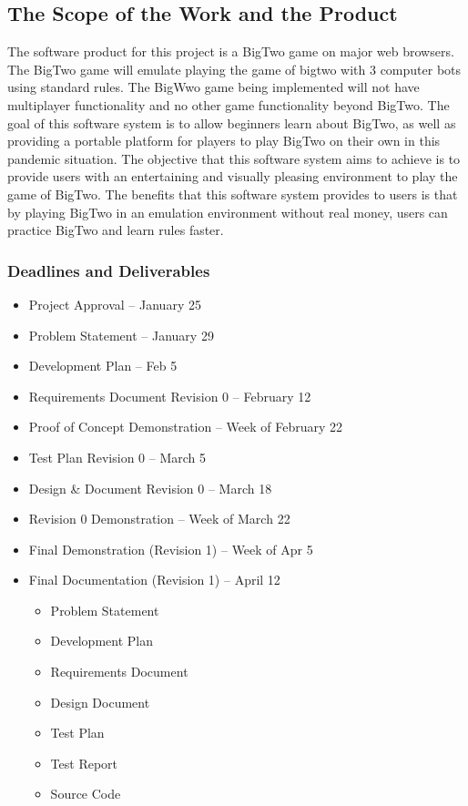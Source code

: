 \documentclass[12pt, titlepage]{article}
\begin{document}
\subsection{The Scope of the Work and the Product}
The software product for this project is a BigTwo game on major web browsers. The BigTwo game will emulate playing the game of bigtwo with 3 computer bots using standard rules. The BigWwo game being implemented will not have multiplayer functionality and no other game functionality beyond BigTwo.
The goal of this software system is to allow beginners learn about BigTwo, as well as providing a portable platform for players to play BigTwo on their own in this pandemic situation. The objective that this software system aims to achieve is to provide users
with an entertaining and visually pleasing environment to play the game of
BigTwo. The benefits that this software system provides to users is that by playing
BigTwo in an emulation environment without real money, users can practice BigTwo and learn rules faster.

\bigskip
\newline

\noindent \subsubsection{Deadlines and Deliverables}
\begin{itemize}
\item Project Approval -- January 25
\item Problem Statement -- January 29
\item Development Plan -- Feb 5
\item Requirements Document Revision 0 -- February 12
\item Proof of Concept Demonstration -- Week of February 22 
\item Test Plan Revision 0 -- March 5
\item Design & Document Revision 0 -- March 18
\item Revision 0 Demonstration -- Week of March 22
\item Final Demonstration (Revision 1) -- Week of Apr 5
\item Final Documentation (Revision 1) -- April 12
    \begin{itemize}
        \item Problem Statement
        \item Development Plan
        \item Requirements Document
        \item Design Document
        \item Test Plan
        \item Test Report
        \item Source Code
    \end{itemize}
\end{itemize}
\end{document}

